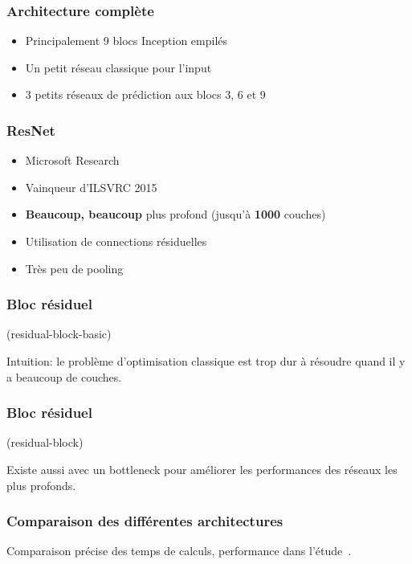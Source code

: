 \documentclass{formation}
\begin{document}
\begin{frame}
  \frametitle{Architecture complète}
  \begin{itemize}
  \item Principalement 9 blocs Inception empilés
    
  \item Un \og petit\fg{} réseau classique pour l'input
  \item 3 \og petits \fg{} réseaux de prédiction aux blocs
    3, 6 et 9 \pause \\
  \end{itemize}
\end{frame}

\begin{frame}
  \frametitle{ResNet}
  \begin{itemize}
  \item Microsoft Research~\cite{He2016}
  \item Vainqueur d'ILSVRC 2015
  \item \textbf{Beaucoup, beaucoup } plus profond (jusqu'à
    \textbf{1000} couches)
  \item Utilisation de connections résiduelles
  \item Très peu de pooling
  \end{itemize}
\end{frame}

\begin{frame}
  \frametitle{Bloc résiduel}
   (residual-block-basic)

  Intuition: le problème d'optimisation classique est trop dur à
  résoudre quand il y a beaucoup de couches.
\end{frame}

\begin{frame}
  \frametitle{Bloc résiduel}
   (residual-block)

  Existe aussi avec un \og bottleneck \fg{} pour améliorer les
  performances des réseaux les plus profonds.
\end{frame}

\begin{frame}
  \frametitle{Comparaison des différentes architectures}
  Comparaison précise des temps de calculs, performance dans
  l'étude~\cite{Canziani2016}.
\end{frame}

\begin{frame}[allowframebreaks]
  
\end{frame}
\end{document}
